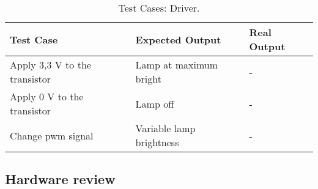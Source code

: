\begin{table}[H]
	\centering
	\resizebox{\columnwidth}{!}
	{
		\begin{tabular}{|m{3cm}|m{5cm}||m{5cm}|}
			\hline
			\textbf{Test Case} & \textbf{Expected Output} & \textbf{Real Output}
			\\\hline\hline
			Apply 3,3 V to the transistor & Lamp at maximum bright & -
			\\\hline
			Apply 0 V to the transistor & Lamp off & -
			\\\hline
			Change \ac{pwm} signal & Variable lamp brightness & -
			\\\hline
		\end{tabular}
	}
	\caption{Test Cases: Driver.}
	\label{table:test_driver}
\end{table}

\subsection{Hardware review} %
